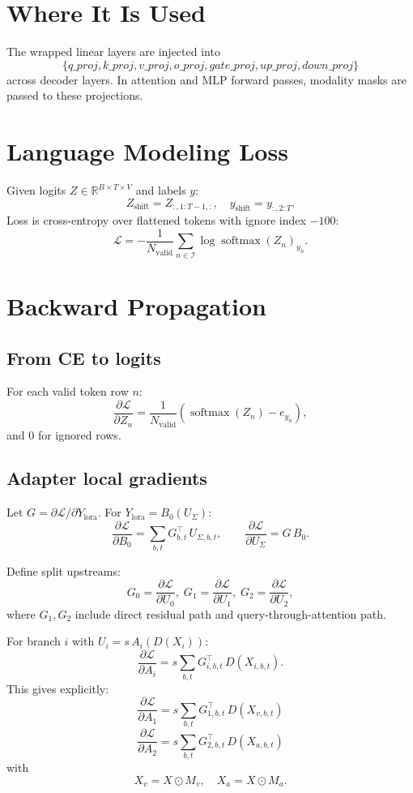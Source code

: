 \documentclass[11pt]{article}
\begin{document}
\section{Where It Is Used}
The wrapped linear layers are injected into
\[
\{q\_proj,k\_proj,v\_proj,o\_proj,gate\_proj,up\_proj,down\_proj\}
\]
across decoder layers. In attention and MLP forward passes, modality masks are passed to these projections.

\section{Language Modeling Loss}
Given logits $Z\in\mathbb{R}^{B\times T\times V}$ and labels $y$:
\[
Z_{\text{shift}}=Z_{:,1:T-1,:},\quad
y_{\text{shift}}=y_{:,2:T}.
\]
Loss is cross-entropy over flattened tokens with ignore index $-100$:
\[
\mathcal L = -\frac{1}{N_{\text{valid}}}\sum_{n\in\mathcal I}
\log\operatorname{softmax}(Z_n)_{y_n}.
\]

\section{Backward Propagation}
\subsection{From CE to logits}
For each valid token row $n$:
\[
\frac{\partial \mathcal L}{\partial Z_n}
=
\frac{1}{N_{\text{valid}}}\left(\operatorname{softmax}(Z_n)-e_{y_n}\right),
\]
and $0$ for ignored rows.

\subsection{Adapter local gradients}
Let $G=\partial\mathcal L/\partial Y_{\text{lora}}$.
For $Y_{\text{lora}}=B_0(U_{\Sigma})$:
\[
\frac{\partial\mathcal L}{\partial B_0}
=
\sum_{b,t} G_{b,t}^{\top}\,U_{\Sigma,b,t},
\qquad
\frac{\partial\mathcal L}{\partial U_{\Sigma}}
=
G\,B_0.
\]

Define split upstreams:
\[
G_0=\frac{\partial\mathcal L}{\partial U_0},\;
G_1=\frac{\partial\mathcal L}{\partial U_1},\;
G_2=\frac{\partial\mathcal L}{\partial U_2},
\]
where $G_1,G_2$ include direct residual path and query-through-attention path.

For branch $i$ with $U_i=s\,A_i(D(X_i))$:
\[
\frac{\partial\mathcal L}{\partial A_i}
=
s\sum_{b,t} G_{i,b,t}^{\top}\,D(X_{i,b,t}).
\]
This gives explicitly:
\[
\boxed{
\frac{\partial\mathcal L}{\partial A_1}
=
s\sum_{b,t} G_{1,b,t}^{\top}\,D(X_{v,b,t})
}
\]
\[
\boxed{
\frac{\partial\mathcal L}{\partial A_2}
=
s\sum_{b,t} G_{2,b,t}^{\top}\,D(X_{a,b,t})
}
\]
with
\[
X_v=X\odot M_v,\quad X_a=X\odot M_a.
\]
\end{document}
